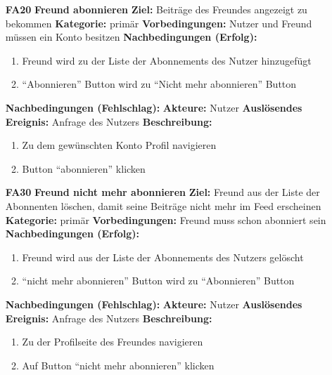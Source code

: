 \documentclass[parskip=full]{scrartcl}
\begin{document}
\begin{itemize}[nosep]
			\item[\textbf{\large FA20}]\textbf{\large Freund abonnieren}
				\newline\newline \textbf{Ziel:} Beiträge des Freundes angezeigt zu bekommen
				\newline \textbf{Kategorie:} primär
				\newline \textbf{Vorbedingungen:} Nutzer und Freund müssen ein Konto besitzen
				\newline \textbf{Nachbedingungen (Erfolg):} 
				\begin{enumerate}[nosep]
					\item Freund wird zu der Liste der Abonnements des Nutzer hinzugefügt
					\item “Abonnieren” Button wird zu “Nicht mehr abonnieren” Button
				\end{enumerate}
				\textbf{Nachbedingungen (Fehlschlag):}
				\newline \textbf{Akteure:} Nutzer
				\newline \textbf{Auslösendes Ereignis:} Anfrage des Nutzers
				\newline \textbf{Beschreibung:}
				\begin{enumerate}[nosep]
					\item Zu dem gewünschten Konto Profil navigieren
					\item Button “abonnieren” klicken
				\end{enumerate}
			
			\item[\textbf{\large FA30}]\textbf{\large Freund nicht mehr abonnieren}
				\newline \textbf{Ziel:} Freund aus der Liste der Abonnenten löschen, damit seine Beiträge nicht mehr im \gls{Feed} erscheinen
				\newline \textbf{Kategorie:} primär
				\newline \textbf{Vorbedingungen:} Freund muss schon abonniert sein
				\newline \textbf{Nachbedingungen (Erfolg):} 
				\begin{enumerate}[nosep]
					\item Freund wird aus der Liste der Abonnements des Nutzers gelöscht
					\item “nicht mehr abonnieren” Button wird zu “Abonnieren” Button
				\end{enumerate}
				\textbf{Nachbedingungen (Fehlschlag):}
				\newline \textbf{Akteure:} Nutzer
				\newline \textbf{Auslösendes Ereignis:} Anfrage des Nutzers
				\newline \textbf{Beschreibung:}
				\begin{enumerate}[nosep]
					\item Zu der Profilseite des Freundes navigieren
					\item Auf Button “nicht mehr abonnieren” klicken
				\end{enumerate}
		\end{itemize}
		
\end{document}
